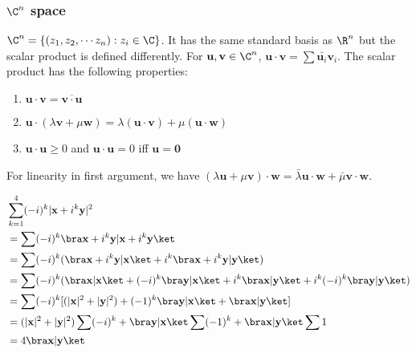 \documentclass[a4paper]{article}
\begin{document}
\subsubsection{\texorpdfstring{$\C^n$}{Cn} space}
\begin{defi}[$\C^n$]
  $\C^n = \{(z_1, z_2, \cdots z_n): z_i\in\C\}$. It has the same standard basis as $\R^n$ but the scalar product is defined differently. For $\mathbf{u, v}\in \C^n$, $\mathbf{u\cdot v} = \sum \bar{\mathbf{u}_i}\mathbf{v}_i$. The scalar product has the following properties:
  \begin{enumerate}
    \item $\mathbf{u\cdot v = \overline{v\cdot u}}$
    \item $\mathbf{u}\cdot(\lambda\mathbf{v}+\mu\mathbf{w}) = \lambda\mathbf{(u\cdot v)} + \mu\mathbf{(u\cdot w)}$
    \item $\mathbf{u\cdot u} \geq 0$ and $\mathbf{u\cdot u} = 0$ iff $\mathbf{u = 0}$
  \end{enumerate}
\end{defi}
\note For linearity in first argument, we have $(\lambda\mathbf{u} + \mu\mathbf{v})\cdot\mathbf{w} = \bar{\lambda}\mathbf{u\cdot w} + \bar \mu\mathbf{v\cdot w}$.

\begin{eg}
  \begin{align*}
    &\sum_{k = 1}^4 (-i)^k|\mathbf{x} + i^k\mathbf{y}|^2\\
    &= \sum(-i)^k\bra\mathbf{x} + i^k \mathbf{y}|\mathbf{x} + i^k\mathbf{y}\ket\\
    &= \sum(-i)^k (\bra\mathbf{x} + i^k\mathbf{y}|\mathbf{x}\ket + i^k\bra\mathbf{x} + i^k\mathbf{y} | \mathbf{y}\ket)\\
    &= \sum(-i)^k (\bra\mathbf{x}|\mathbf{x}\ket + (-i)^k\bra\mathbf{y}|\mathbf{x}\ket + i^k\bra\mathbf{x}|\mathbf{y}\ket + i^k(-i)^k\bra\mathbf{y}|\mathbf{y}\ket)\\
    &= \sum(-i)^k [(|\mathbf{x}|^2 + |\mathbf{y}|^2) + (-1)^k\bra\mathbf{y}|\mathbf{x}\ket + \bra\mathbf{x}|\mathbf{y}\ket]\\
    &= (|\mathbf{x}|^2 + |\mathbf{y}|^2)\sum(-i)^k + \bra\mathbf{y}|\mathbf{x}\ket\sum(-1)^k + \bra\mathbf{x}|\mathbf{y}\ket\sum1\\
    &= 4\bra\mathbf{x}|\mathbf{y}\ket
  \end{align*}
\end{eg}
\end{document}
